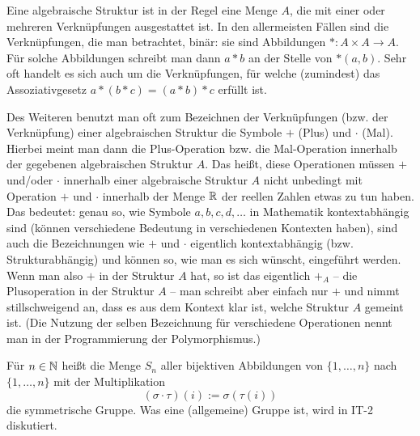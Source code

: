 \begin{bem} 
	Eine algebraische Struktur ist in der Regel eine Menge $A$, die mit einer oder mehreren Verknüpfungen ausgestattet ist. In den allermeisten Fällen sind die Verknüpfungen, die man betrachtet, binär: sie sind Abbildungen $\ast : A \times A \rightarrow A$.  Für solche Abbildungen schreibt man dann $a \ast b$ an der Stelle von $\ast(a,b)$. Sehr oft handelt es sich auch um die Verknüpfungen, für welche (zumindest) das Assoziativgesetz $a \ast (b \ast c) = (a \ast b) \ast c$ erfüllt ist. 
	
	
	Des Weiteren benutzt man oft zum Bezeichnen der Verknüpfungen (bzw. der Verknüpfung) einer algebraischen Struktur die Symbole $+$ (Plus) und $\cdot$ (Mal). Hierbei meint man dann die Plus-Operation bzw. die Mal-Operation innerhalb der gegebenen algebraischen Struktur $A$. Das heißt, diese Operationen müssen $+$ und/oder $\cdot$ innerhalb einer algebraische Struktur $A$ nicht unbedingt mit Operation $+$ und $\cdot$ innerhalb der Menge $\mathbb{R}$ der reellen Zahlen etwas zu tun haben. Das bedeutet:  genau so, wie Symbole $a,b,c,d,\ldots$ in Mathematik kontextabhängig sind (können verschiedene Bedeutung in verschiedenen Kontexten haben), sind auch die Bezeichnungen wie $+$ und $\cdot$ eigentlich kontextabhängig (bzw. Strukturabhängig) und können so, wie man es sich wünscht, eingeführt werden. Wenn man also $+$ in der Struktur $A$ hat, so ist das eigentlich $+_A$ -- die Plusoperation in der Struktur $A$ -- man schreibt aber einfach nur $+$ und nimmt stillschweigend  an, dass es aus dem Kontext klar ist, welche Struktur $A$ gemeint ist. (Die Nutzung der selben Bezeichnung für verschiedene Operationen nennt man in der Programmierung der Polymorphismus.) 
\end{bem} 

\begin{bsp}
	Für $n \in \mathbb{N}$ heißt die Menge $S_n$ aller bijektiven Abbildungen von $\{1,\ldots,n\}$ nach $\{1,\ldots,n\}$ mit der Multiplikation 
	\[(\sigma \cdot \tau )(i) := \sigma(\tau(i))
	\] die symmetrische Gruppe. Was eine (allgemeine) Gruppe ist, wird in IT-2 diskutiert. 
\end{bsp} 

